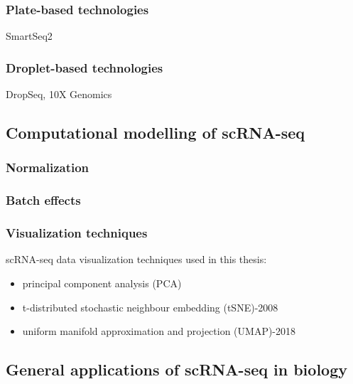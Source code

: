 \subsubsection{Plate-based technologies}

SmartSeq2

\subsubsection{Droplet-based technologies}

DropSeq, 10X Genomics


\subsection{Computational modelling of scRNA-seq}
\subsubsection{Normalization}

\subsubsection{Batch effects}

\subsubsection{Visualization techniques}

scRNA-seq data visualization techniques used in this thesis: 

\begin{itemize}
    \item principal component analysis (PCA)
    \item t-distributed stochastic neighbour embedding (tSNE)-2008 \cite{maaten2008visualizing}
    \item uniform manifold approximation and projection (UMAP)-2018 \cite{mcinnes2018umap}
\end{itemize}

\subsection{General applications of scRNA-seq in biology}

